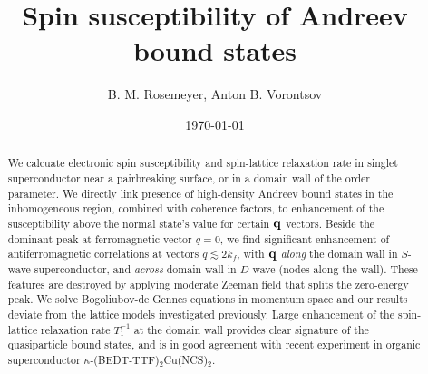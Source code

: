 \documentclass[prb,aps,showpacs,amsmath,twocolumn,10pt]{revtex4-1}
\newcommand{\blue}{\textcolor{blue}}
\newcommand{\kbtf}{$\kappa$-(BEDT-TTF)$_2$Cu(NCS)$_2$}
\begin{document}
\title{Spin susceptibility of Andreev bound states} 

\author{B. M. Rosemeyer, Anton B. Vorontsov}

\date{\today}

\begin{abstract}
%
We calcuate electronic spin susceptibility and spin-lattice relaxation rate 
in singlet superconductor near a pairbreaking surface, or in a domain wall of the order parameter. 
We directly link presence of high-density Andreev bound states in the inhomogeneous region, combined with coherence factors, 
to enhancement of the susceptibility above the normal state's value for certain ${\bf q}$ vectors.  
Beside the dominant peak at ferromagnetic vector $q=0$, we find significant enhancement of 
antiferromagnetic correlations at vectors $q\lesssim 2 k_f$, 
with ${\bf q}$ \emph{along} the domain wall in $S$-wave superconductor, 
and \emph{across} domain wall in $D$-wave (nodes along the wall). 
These features are destroyed by applying moderate Zeeman field that splits the zero-energy peak. 
We solve Bogoliubov-de Gennes equations in momentum space and 
our results deviate from the lattice models investigated previously. 
Large enhancement of the spin-lattice relaxation rate $T_1^{-1}$ at the domain wall 
provides clear signature of the quasiparticle bound states, 
and is in good agreement with recent experiment in organic superconductor \kbtf. 
\end{abstract} 


\maketitle
\end{document}
